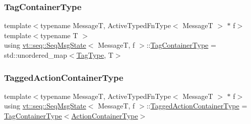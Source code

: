 \mbox{\label{structvt_1_1seq_1_1_seq_msg_state_af44de5aa05c93ee8fa1bc2a84c7107bb}} 
\subsubsection{\texorpdfstring{Tag\+Container\+Type}{TagContainerType}}
{\footnotesize\ttfamily template$<$typename MessageT, Active\+Typed\+Fn\+Type$<$ Message\+T $>$ $\ast$ f$>$ \\
template$<$typename T $>$ \\
using \hyperlink{structvt_1_1seq_1_1_seq_msg_state}{vt\+::seq\+::\+Seq\+Msg\+State}$<$ MessageT, f $>$\+::\hyperlink{structvt_1_1seq_1_1_seq_msg_state_af44de5aa05c93ee8fa1bc2a84c7107bb}{Tag\+Container\+Type} =  std\+::unordered\+\_\+map$<$\hyperlink{namespacevt_a84ab281dae04a52a4b243d6bf62d0e52}{Tag\+Type}, T$>$}

\mbox{\label{structvt_1_1seq_1_1_seq_msg_state_a0f9787d4224b8017484093f967200209}} 
\subsubsection{\texorpdfstring{Tagged\+Action\+Container\+Type}{TaggedActionContainerType}}
{\footnotesize\ttfamily template$<$typename MessageT, Active\+Typed\+Fn\+Type$<$ Message\+T $>$ $\ast$ f$>$ \\
using \hyperlink{structvt_1_1seq_1_1_seq_msg_state}{vt\+::seq\+::\+Seq\+Msg\+State}$<$ MessageT, f $>$\+::\hyperlink{structvt_1_1seq_1_1_seq_msg_state_a0f9787d4224b8017484093f967200209}{Tagged\+Action\+Container\+Type} =  \hyperlink{structvt_1_1seq_1_1_seq_msg_state_af44de5aa05c93ee8fa1bc2a84c7107bb}{Tag\+Container\+Type}$<$\hyperlink{structvt_1_1seq_1_1_seq_msg_state_a8a998ddbdeee6bd4882f82e0cb1cd6f1}{Action\+Container\+Type}$>$}

\mbox{\label{structvt_1_1seq_1_1_seq_msg_state_a57de558c4a7efb36b5358117c6f6d4c5}} 
